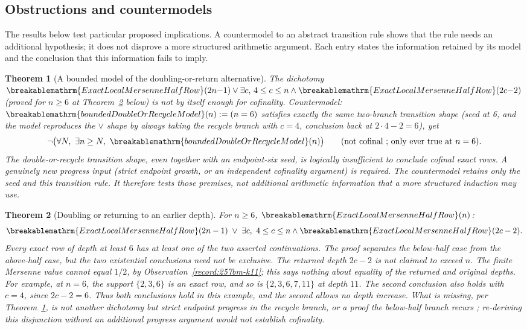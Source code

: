 \documentclass[11pt]{article}
\theoremstyle{plain}
\newtheorem{thm}{Theorem}[section]
\theoremstyle{definition}
\theoremstyle{remark}
\renewcommand{\mathrm}[1]{\ifmmode\breakablemathrm{#1}\else\textrm{#1}\fi}%
\begin{document}
\subsection{Obstructions and countermodels}

The results below test particular proposed implications.  A countermodel
to an abstract transition rule shows that the rule needs an additional
hypothesis; it does not disprove a more structured arithmetic
argument.  Each entry states the information retained by its model
and the conclusion that this information fails to imply.

\begin{thm}[A bounded model of the doubling-or-return alternative]\label{record:257bm-k1}
The dichotomy $\mathrm{ExactLocalMersenneHalfRow}(2n{-}1) \vee \exists c,\,4\le c\le n\wedge
\mathrm{ExactLocalMersenneHalfRow}(2c{-}2)$ (proved for $n\ge6$ at Theorem~\ref{record:257bm-k-dich} below) is not by
itself enough for cofinality. Countermodel: $\mathrm{boundedDoubleOrRecycleModel}(n) := (n=6)$
satisfies exactly the same two-branch transition shape (seed at 6, and the
model reproduces the $\vee$ shape by always taking
the recycle branch with $c=4$, conclusion back at $2\cdot4-2=6$), yet
\[
\neg\big(\forall N,\ \exists n\ge N,\ \mathrm{boundedDoubleOrRecycleModel}(n)\big) \qquad \text{(not cofinal ;  only ever true at } n=6\text{)}.
\]
The
double-or-recycle transition shape, even together with an endpoint-six seed, is logically
insufficient to conclude cofinal exact rows. A genuinely new progress input (strict endpoint
growth, or an independent cofinality argument) is required. The countermodel retains only the seed and this transition rule.  It
therefore tests those premises, not additional arithmetic information
that a more structured induction may use.
\end{thm}

\begin{thm}[Doubling or returning to an earlier depth]\label{record:257bm-k-dich}
For $n\ge6$, $\mathrm{ExactLocalMersenneHalfRow}(n)$:
\[
\mathrm{ExactLocalMersenneHalfRow}(2n-1) \;\vee\; \exists c,\ 4\le c\le n \wedge \mathrm{ExactLocalMersenneHalfRow}(2c-2).
\]
Every exact row of depth at least $6$ has at least one of the two
asserted continuations.  The proof separates the below-half case from
the above-half case, but the two existential conclusions need not be
exclusive.  The returned depth $2c-2$ is not claimed to exceed $n$. The finite Mersenne value cannot equal $1/2$, by
Observation~\ref{record:257bm-k11}; this says nothing about equality
of the returned and original depths.  For example, at $n=6$, the
support $\{2,3,6\}$ is an exact row, and so is
$\{2,3,6,7,11\}$ at depth $11$.  The second conclusion also holds
with $c=4$, since $2c-2=6$.  Thus both conclusions hold in this example,
and the second allows no depth increase.  What is
missing, per Theorem~\ref{record:257bm-k1}, is not another dichotomy but strict endpoint progress in the recycle
branch, or a proof the below-half branch recurs ;  re-deriving this disjunction without an additional progress argument
would not establish cofinality.
\end{thm}
\end{document}
